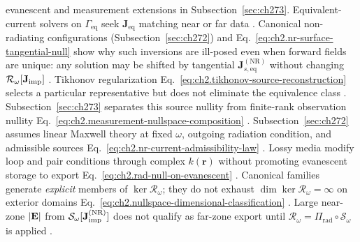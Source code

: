 evanescent and measurement extensions in Subsection~\ref{sec:ch273}. Equivalent-current solvers on \(\Gamma_{\mathrm{eq}}\) seek \(\mathbf{J}_{\mathrm{eq}}\) matching
near or far data \cite{stratton1941}. Canonical non-radiating configurations (Subsection~\ref{sec:ch272}) and Eq.~\eqref{eq:ch2.nr-surface-tangential-null}
show why such inversions are ill-posed even when forward fields are unique: any solution may
be shifted by tangential \(\mathbf{J}_{s,\mathrm{eq}}^{\mathrm{(NR)}}\) without changing
\(\mathcal{R}_\omega[\mathbf{J}_{\mathrm{imp}}]\) \cite{stratton1941}. Tikhonov regularization
Eq.~\eqref{eq:ch2.tikhonov-source-reconstruction} selects a particular representative but does
not eliminate the equivalence class \cite{harrington2001}. Subsection~\ref{sec:ch273} separates
this source nullity from finite-rank observation nullity
Eq.~\eqref{eq:ch2.measurement-nullspace-composition} \cite{stratton1941}. Subsection~\ref{sec:ch272} assumes linear Maxwell theory at fixed
\(\omega\), outgoing radiation condition, and admissible sources Eq.~\eqref{eq:ch2.nr-current-admissibility-law}
\cite{stratton1941}. Lossy media modify loop and pair conditions through complex
\(k(\mathbf{r})\) without promoting evanescent storage to export
Eq.~\eqref{eq:ch2.rad-null-on-evanescent} \cite{stratton1941}. Canonical families generate
\emph{explicit} members of \(\ker\mathcal{R}_\omega\); they do not exhaust
\(\dim\ker\mathcal{R}_\omega=\infty\) on exterior domains
Eq.~\eqref{eq:ch2.nullspace-dimensional-classification} \cite{harrington2001}.
Large near-zone \(|\mathbf{E}|\) from \(\mathcal{S}_\omega[\mathbf{J}_{\mathrm{imp}}^{\mathrm{(NR)}}]\) does not qualify as
far-zone export until $\mathcal{R}_\omega=\Pi_{\mathrm{rad}}\circ\mathcal{S}_\omega$ is applied
\cite{stratton1941}.
